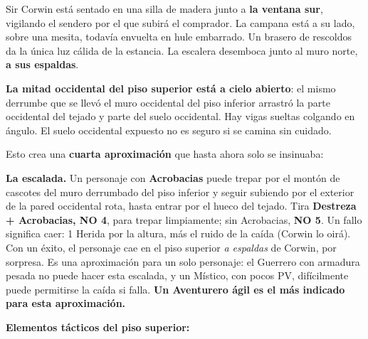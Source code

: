 \documentclass[10pt,a4paper]{article}
\begin{document}
Sir Corwin está sentado en una silla de madera junto a \textbf{la ventana sur}, vigilando el sendero por el que subirá el comprador. La campana está a su lado, sobre una mesita, todavía envuelta en hule embarrado. Un brasero de rescoldos da la única luz cálida de la estancia. La escalera desemboca junto al muro norte, \textbf{a sus espaldas}.

\textbf{La mitad occidental del piso superior está a cielo abierto}: el mismo derrumbe que se llevó el muro occidental del piso inferior arrastró la parte occidental del tejado y parte del suelo occidental. Hay vigas sueltas colgando en ángulo. El suelo occidental expuesto no es seguro si se camina sin cuidado.

Esto crea una \textbf{cuarta aproximación} que hasta ahora solo se insinuaba:

\textbf{La escalada.} Un personaje con \textbf{Acrobacias} puede trepar por el montón de cascotes del muro derrumbado del piso inferior y seguir subiendo por el exterior de la pared occidental rota, hasta entrar por el hueco del tejado. Tira \textbf{Destreza + Acrobacias, NO 4}, para trepar limpiamente; sin Acrobacias, \textbf{NO 5}. Un fallo significa caer: 1 Herida por la altura, más el ruido de la caída (Corwin lo oirá). Con un éxito, el personaje cae en el piso superior \emph{a espaldas} de Corwin, por sorpresa. Es una aproximación para un solo personaje: el Guerrero con armadura pesada no puede hacer esta escalada, y un Místico, con pocos PV, difícilmente puede permitirse la caída si falla. \textbf{Un Aventurero ágil es el más indicado para esta aproximación.}

\par{}\noindent\textbf{Elementos tácticos del piso superior:}
\end{document}
